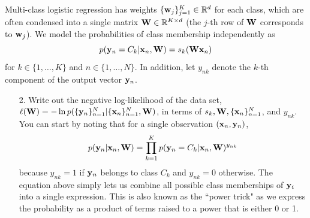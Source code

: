 \documentclass[submit]{harvardml}
\begin{document}
\begin{problem}
Multi-class logistic regression has weights $\{\mathbf{w}_j\}_{j=1}^K \in \mathbb{R}^d$ for each class, which are often condensed into a single matrix $\mathbf{W} \in \mathbb{R}^{K \times d}$ (the $j$-th row of $\mathbf{W}$ corresponds to $\mathbf{w}_j$). We model the probabilities of class membership independently as
$$
p(\mathbf{y}_n = C_k | \mathbf{x}_n, \mathbf{W}) = s_k(\mathbf{W}\mathbf{x}_n)
$$
for $k \in \{1, \dots, K\}$ and $n \in \{1, \dots, N\}$.
In addition, let $y_{nk}$ denote the $k$-th component of the output vector $\mathbf{y}_n$. 
\begin{enumerate}
    \item[2.] Write out the negative log-likelihood of the data set, $\ell(\mathbf{W}) = -\ln p(\{\mathbf{y}_n\}_{n=1}^N | \{\mathbf{x}_n\}_{n=1}^N, \mathbf{W})$, in terms of $s_k, \mathbf{W}, \{\mathbf{x}_n\}_{n=1}^N$, and $y_{nk}$. You can start by noting that for a single observation $(\mathbf{x}_n, \mathbf{y}_n)$,
    $$
    p(\mathbf{y}_n | \mathbf{x}_n, \mathbf{W}) = \prod_{k=1}^Kp(\mathbf{y}_n = C_k | \mathbf{x}_n, \mathbf{W})^{y_{nk}}
    $$
    because $y_{nk} = 1$ if $\mathbf{y}_n$ belongs to class $C_k$ and $y_{nk} = 0$ otherwise. The equation above simply lets us combine all possible class memberships of $\mathbf{y}_i$ into a single expression. This is also known as the ``power trick" as we express the probability as a product of terms raised to a power that is either 0 or 1.
\end{enumerate}
\end{problem}
\end{document}
